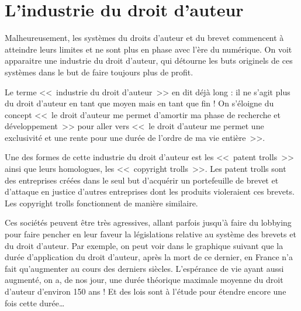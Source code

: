 \section{L'industrie du droit d'auteur}

Malheureusement, les systèmes du droits d'auteur et du brevet commencent à atteindre leurs limites et ne sont plus en phase avec l'ère du numérique.
On voit apparaitre une industrie du droit d'auteur, qui détourne les buts originels de ces systèmes dans le but de faire toujours plus de profit.

Le terme <<~industrie du droit d'auteur~>> en dit déjà long : il ne s'agit plus du droit d'auteur en tant que moyen mais en tant que fin !
On s'éloigne du concept <<~le droit d'auteur me permet d'amortir ma phase de recherche et développement~>> pour aller vers <<~le droit d'auteur me permet une exclusivité et une rente pour une durée de l'ordre de ma vie entière~>>.

Une des formes de cette industrie du droit d'auteur est les <<~patent trolls~>> ainsi que leurs homologues, les <<~copyright trolls~>>.
Les patent trolls sont des entreprises créées dans le seul but d'acquérir un portefeuille de brevet et d'attaque en justice d'autres entreprises dont les produits violeraient ces brevets.
Les copyright trolls fonctionnent de manière similaire.

Ces sociétés peuvent être très agressives, allant parfois jusqu'à faire du lobbying pour faire pencher en leur faveur la législations relative au système des brevets et du droit d'auteur.
Par exemple, on peut voir dans le graphique suivant que la durée d'application du droit d'auteur, après la mort de ce dernier, en France n'a fait qu'augmenter au cours des derniers siècles.
L'espérance de vie ayant aussi augmenté, on a, de nos jour, une durée théorique maximale moyenne du droit d'auteur d'environ 150 ans ! Et des lois sont à l'étude pour étendre encore une fois cette durée\dots{}

